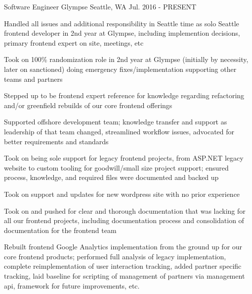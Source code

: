 

\begin{cventries}

  \cventry
    {Software Engineer} %
    {Glympse} %
    {Seattle, WA} %
    {Jul. 2016 - PRESENT} %
    {
      \begin{cvitems} %
        \item {Handled all issues and additional responsibility in Seattle time as solo Seattle frontend developer in 2nd year at Glympse, including implemention decisions, primary frontend expert on site, meetings, etc}
        \item {Took on 100\% randomization role in 2nd year at Glympse (initially by necessity, later on sanctioned) doing emergency fixes/implementation supporting other teams and partners}
        \item {Stepped up to be frontend expert reference for knowledge regarding refactoring and/or greenfield rebuilds of our core frontend offerings}
        \item {Supported offshore development team; knowledge transfer and support as leadership of that team changed, streamlined workflow issues, advocated for better requirements and standards}
        \item {Took on being sole support for legacy frontend projects, from ASP.NET legacy website to custom tooling for goodwill/small size project support; ensured process, knowledge, and required files were documented and backed up}
        \item {Took on support and updates for new wordpress site with no prior experience}
        \item {Took on and pushed for clear and thorough documentation that was lacking for all our frontend projects, including documentation process and consolidation of documentation for the frontend team}
        \item {Rebuilt frontend Google Analytics implementation from the ground up for our core frontend products; performed full analysis of legacy implementation, complete reimplementation of user interaction tracking, added partner specific tracking, laid baseline for scripting of management of partners via management api, framework for future improvements, etc.}

\end{cvitems}}
\end{cventries}
